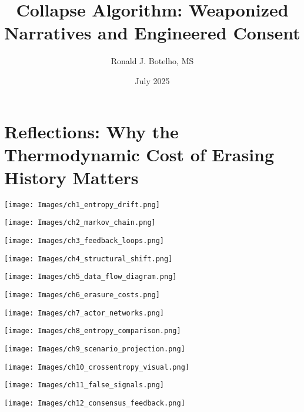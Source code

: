 \documentclass[12pt]{book}
\title{Collapse Algorithm: Weaponized Narratives and Engineered Consent}
\author{Ronald J. Botelho, MS}
\date{July 2025}
\begin{document}
\maketitle

\frontmatter


\chapter*{Reflections: Why the Thermodynamic Cost of Erasing History Matters}




\newpage
\tableofcontents
\newpage

\mainmatter


\texttt{[image: Images/ch1\_entropy\_drift.png]}


\texttt{[image: Images/ch2\_markov\_chain.png]}


\texttt{[image: Images/ch3\_feedback\_loops.png]}


\texttt{[image: Images/ch4\_structural\_shift.png]}


\texttt{[image: Images/ch5\_data\_flow\_diagram.png]}


\texttt{[image: Images/ch6\_erasure\_costs.png]}


\texttt{[image: Images/ch7\_actor\_networks.png]}


\texttt{[image: Images/ch8\_entropy\_comparison.png]}


\texttt{[image: Images/ch9\_scenario\_projection.png]}


\texttt{[image: Images/ch10\_crossentropy\_visual.png]}


\texttt{[image: Images/ch11\_false\_signals.png]}


\texttt{[image: Images/ch12\_consensus\_feedback.png]}
\end{document}
